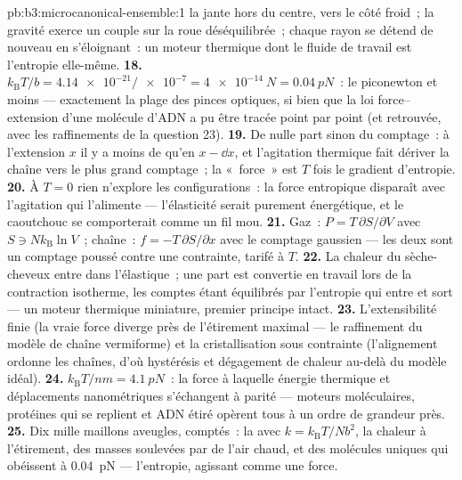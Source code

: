 \begin{solution}{pb:b3:microcanonical-ensemble:1}
la jante hors du centre, vers le côté froid~; la gravité exerce un
couple sur la roue déséquilibrée~; chaque rayon se détend de nouveau
en s'éloignant~: un moteur thermique dont le fluide de travail est
l'entropie elle-même.
\textbf{18.} $k_{\text{B}}T/b = \num{4.14e-21}/\num{e-7} =
\qty{4e-14}{N} = \qty{0.04}{pN}$~: le piconewton et moins ---
exactement la plage des pinces optiques, si bien que la loi
force--extension d'une molécule d'ADN a pu être tracée point par point
(et retrouvée, avec les raffinements de la question 23).
\textbf{19.} De nulle part sinon du comptage~: à l'extension $x$ il y
a moins de  qu'en $x - \dd x$, et l'agitation thermique
fait dériver la chaîne vers le plus grand comptage~; la «~force~» est
$T$ fois le gradient d'entropie.
\textbf{20.} À $T = 0$ rien n'explore les configurations~: la force
entropique disparaît avec l'agitation qui l'alimente --- l'élasticité
serait purement énergétique, et le caoutchouc se comporterait comme
un fil mou.
\textbf{21.} Gaz~: $P = T\,\partial S/\partial V$ avec $S \ni
Nk_{\text{B}}\ln V$~; chaîne~: $f = -T\,\partial S/\partial x$ avec
le comptage gaussien --- les deux sont un comptage poussé contre une
contrainte, tarifé à $T$.
\textbf{22.} La chaleur du sèche-cheveux entre dans l'élastique~; une
part est convertie en travail lors de la contraction isotherme, les
comptes étant équilibrés par l'entropie qui entre et sort --- un
moteur thermique miniature, premier principe intact.
\textbf{23.} L'extensibilité finie (la vraie force diverge près de
l'étirement maximal --- le raffinement du modèle de chaîne vermiforme)
et la cristallisation sous contrainte (l'alignement ordonne les
chaînes, d'où hystérésis et dégagement de chaleur au-delà du modèle
idéal).
\textbf{24.} $k_{\text{B}}T/\unit{nm} = \qty{4.1}{pN}$~: la force à
laquelle énergie thermique et déplacements nanométriques s'échangent à
parité --- moteurs moléculaires, protéines qui se replient et ADN
étiré opèrent tous à un ordre de grandeur près.
\textbf{25.} Dix mille maillons aveugles, comptés~: la 
avec $k = k_{\text{B}}T/Nb^2$, la chaleur à l'étirement, des masses
soulevées par de l'air chaud, et des molécules uniques qui obéissent à
\qty{0.04}{pN} --- l'entropie, agissant comme une force.
\end{solution}
